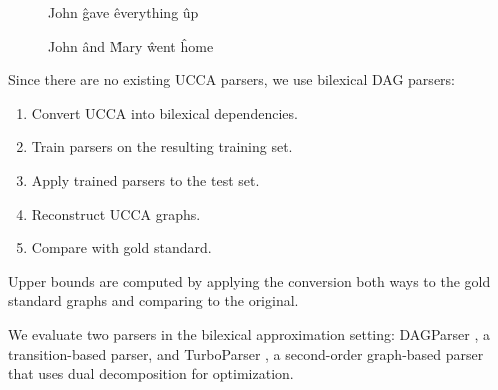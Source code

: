 \documentclass[a0,portrait]{a0poster}
\begin{document}
\begin{multicols}{2}
\begin{figure}
	\begin{dependency}[theme = simple]
	\begin{deptext}[column sep=.7em,ampersand replacement=\^]
	John \^ gave \^ everything \^ up \\
	\end{deptext}
	\end{dependency}
	\begin{dependency}[theme = simple]
	\begin{deptext}[column sep=.7em,ampersand replacement=\^]
	John \^ and \^ Mary \^ went \^ home \\
	\end{deptext}
	\end{dependency}
\end{figure}

Since there are no existing UCCA parsers, we use bilexical DAG parsers:
\begin{enumerate}
 \item Convert UCCA into bilexical dependencies.
 \item Train parsers on the resulting training set.
 \item Apply trained parsers to the test set.
 \item Reconstruct UCCA graphs.
 \item Compare with gold standard.
\end{enumerate}
Upper bounds are computed by applying
the conversion both ways to the gold standard
graphs and comparing to the original.

We evaluate two parsers in the bilexical approximation setting:
DAGParser \cite{ribeyre-villemontedelaclergerie-seddah:2014:SemEval}, a transition-based parser,
and TurboParser \cite{almeida-martins:2015:SemEval},
a second-order graph-based parser that uses dual decomposition for optimization.






\end{multicols}
\end{document}
